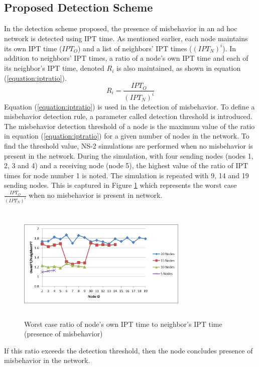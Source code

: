 \documentclass[12pt,letterpaper,english]{article}
\begin{document}
\subsection{Proposed Detection Scheme}
\label{subsection:detectionscheme}
\indent In the detection scheme proposed, the presence of misbehavior in an ad hoc network is detected using IPT time.
As mentioned earlier, each node maintains its own IPT time ($IPT_O$) and a list of neighbors' IPT times ($(IPT_N)^i$). In addition to neighbors' IPT times, a ratio of a node's own IPT time and each of its neighbor's IPT time, denoted $R_i$ is also maintained, as shown in equation (\ref{equation:iptratio}).
\begin{equation}
\label{equation:iptratio}
R_i = \frac{IPT_O}{(IPT_N)^i}
\end{equation}
Equation (\ref{equation:iptratio}) is used in the detection of misbehavior.
To define a misbehavior detection rule, a parameter called detection threshold is introduced. The misbehavior detection threshold of a node is the maximum value of the ratio in equation (\ref{equation:iptratio}) for a given number of nodes in the network. To find the threshold value, NS-2 simulations are performed when no misbehavior is present in the network. During the simulation, with four sending nodes (nodes 1, 2, 3 and 4) and a receiving node (node 5), the highest value of the ratio of IPT times for node number 1 is noted. The simulation is repeated with 9, 14 and 19 sending nodes. This is captured in Figure \ref{figure:worstcaseratio} which represents the worst case $\frac{IPT_O}{(IPT_N)^i}$ when no misbehavior is present in network. 
\begin{figure}[H]
\centering
\includegraphics[width=3.2in,height=2.2in]{figures/worstcaseratio.png}
\caption{Worst case ratio of node's own IPT time to neighbor's IPT time (presence of misbehavior)}
\label{figure:worstcaseratio}
\end{figure}
\indent If this ratio exceeds the detection threshold, then the node concludes presence of misbehavior in the network.
\end{document}
